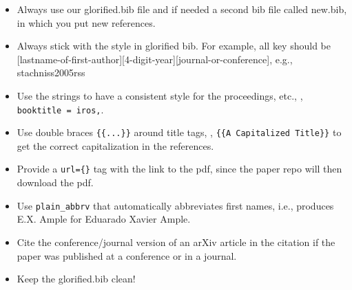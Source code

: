 \documentclass[a4paper, 10 pt, conference]{ieeeconf} %
\begin{document}
\begin{itemize}
  \item Always use our glorified.bib file and if needed a second bib file called new.bib, in which you put new references.
  \item Always stick with the style in glorified bib. For example, all key should be [lastname-of-first-author][4-digit-year][journal-or-conference], e.g., stachniss2005rss
  \item Use the strings to have a consistent style for the proceedings, etc., \ie, \verb#booktitle = iros,#.
  \item Use double braces \verb#{{...}}# around title tags, \ie,  \verb#{{A Capitalized Title}}# to get the correct capitalization in the references.
  \item Provide a \verb#url={}# tag with the link to the pdf, since the paper repo will then download the pdf.
  \item Use \verb#plain_abbrv# that automatically abbreviates first names, i.e., produces E.X. Ample for Eduarado Xavier Ample.
  \item Cite the conference/journal version of an arXiv article in the citation if the paper was published at a conference or in a journal.
  \item Keep the glorified.bib clean!
\end{itemize}




\end{document}
